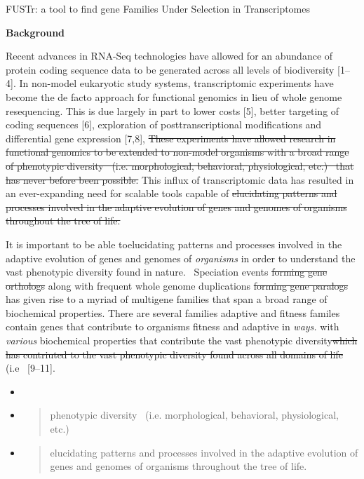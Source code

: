 \documentclass[]{article}
\date{}
\begin{document}
FUSTr: a tool to find gene Families Under Selection in Transcriptomes

\textbf{Background}

Recent advances in RNA-Seq technologies have allowed for an abundance of
protein coding sequence data to be generated across all levels of
biodiversity {[}1--4{]}. In non-model eukaryotic study systems,
transcriptomic experiments have become the de facto approach for
functional genomics in lieu of whole genome resequencing. This is due
largely in part to lower costs {[}5{]}, better targeting of coding
sequences {[}6{]}, exploration of posttranscriptional modifications and
differential gene expression {[}7,8{]}, \sout{These experiments have
allowed research in functional genomics to be extended to non-model
organisms with a broad range of phenotypic diversity ~(i.e.
morphological, behavioral, physiological, etc.) ~that has never before
been possible.} This influx of transcriptomic data has resulted in an
ever-expanding need for scalable tools capable of \sout{elucidating
patterns and processes involved in the adaptive evolution of genes and
genomes of organisms throughout the tree of life.}

It is important to be able toelucidating patterns and processes involved
in the adaptive evolution of genes and genomes of \emph{organisms} in
order to understand the vast phenotypic diversity found in nature.
~Speciation events \sout{forming gene orthologs} along with frequent
whole genome duplications \sout{forming gene paralogs} has given rise to
a myriad of multigene families that span a broad range of biochemical
properties. There are several families adaptive and fitness familes
contain genes that contribute to organisms fitness and adaptive in
\emph{ways.} with \emph{various} biochemical properties that contribute
the vast phenotypic diversity\sout{which has contriuted to the vast
phenotypic diversity found across all domains of life} (i.e
~{[}9--11{]}.

\begin{itemize}
\item
\item
  \begin{quote}
  phenotypic diversity ~(i.e. morphological, behavioral, physiological,
  etc.)
  \end{quote}
\item
  \begin{quote}
  elucidating patterns and processes involved in the adaptive evolution
  of genes and genomes of organisms throughout the tree of life.
  \end{quote}
\end{itemize}
\end{document}
